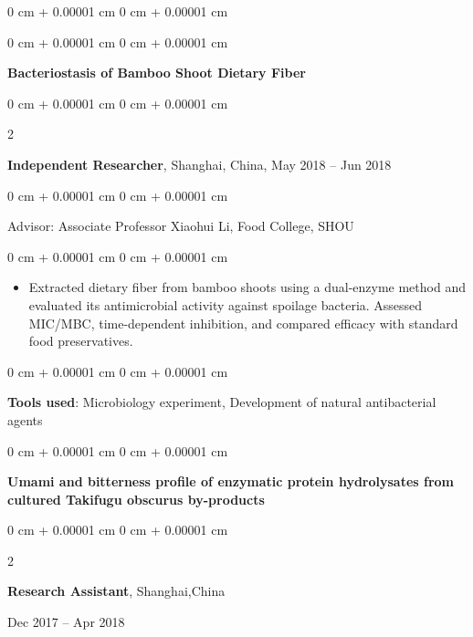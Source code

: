 \documentclass[10pt, letterpaper]{article}
\newenvironment{highlights}{
    \begin{itemize}[
        topsep=0.10 cm,
        parsep=0.10 cm,
        partopsep=0pt,
        itemsep=0pt,
        leftmargin=0 cm + 10pt
    ]
}{
    \end{itemize}
} %
\newenvironment{onecolentry}{
    \begin{adjustwidth}{
        0 cm + 0.00001 cm
    }{
        0 cm + 0.00001 cm
    }
}{
    \end{adjustwidth}
} %
\newenvironment{twocolentry}[2][]{
    \onecolentry
    \def\secondColumn{#2}
    \setcolumnwidth{\fill, 4.5 cm}
    \begin{paracol}{2}
}{
    \switchcolumn \raggedleft \secondColumn
    \end{paracol}
    \endonecolentry
} %
\newenvironment{header}{
    \setlength{\topsep}{0pt}\par\kern\topsep\centering\linespread{1}
}{
    \par\kern\topsep
} %
\begin{document}
\begin{header}
\begin{onecolentry}
\begin{highlights}
            \end{highlights}
        \end{onecolentry}

\vspace{0.2 cm}

           \begin{onecolentry}
        \textbf{Bacteriostasis of Bamboo Shoot Dietary Fiber}
    \end{onecolentry}
        \begin{twocolentry}{
            May 2018 – Jun 2018
        }
            \textbf{Independent Researcher}, Shanghai, China, \end{twocolentry}
\begin{onecolentry}
    Advisor: Associate Professor Xiaohui Li, Food College, SHOU
\end{onecolentry}
        \vspace{0.10 cm}
        \begin{onecolentry}
            \begin{highlights}
                \item Extracted dietary fiber from bamboo shoots using a dual-enzyme method and evaluated its antimicrobial activity against spoilage bacteria. Assessed MIC/MBC, time-dependent inhibition, and compared efficacy with standard food preservatives.
            \end{highlights}
        \end{onecolentry}
\begin{onecolentry}
    \textbf{Tools used}: Microbiology experiment, Development of natural antibacterial agents
\end{onecolentry}
\vspace{0.2 cm}

        \begin{onecolentry}
            \textbf{Umami and bitterness profile of enzymatic protein hydrolysates from cultured Takifugu obscurus by-products}
        \end{onecolentry}
        \begin{twocolentry}{
            Dec 2017 – Apr 2018
        }
            \textbf{Research Assistant}, Shanghai,China
            \end{twocolentry}


\end{header}
\end{document}
